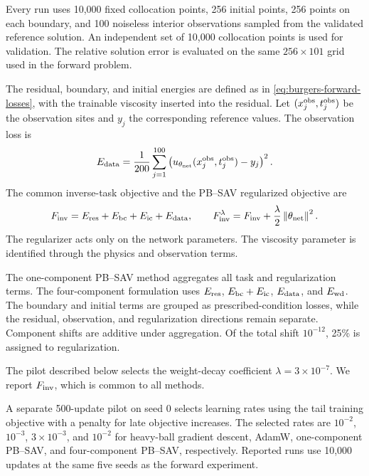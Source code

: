 Every run uses 10,000 fixed collocation points, 256 initial points, 256 points
on each boundary, and 100 noiseless interior observations sampled from the
validated reference solution.  An independent set of 10,000 collocation
points is used for validation.  The relative solution error is evaluated on
the same \(256\times101\) grid used in the forward problem.

The residual, boundary, and initial energies are defined as in
\cref{eq:burgers-forward-losses}, with the trainable viscosity inserted into
the residual.  Let \((x_j^{\rm obs},t_j^{\rm obs})\) be the observation sites
and \(y_j\) the corresponding reference values.  The observation loss is
\begin{equation}
  E_{\rm data}
  =\frac{1}{200}\sum_{j=1}^{100}
  \left(u_{\theta_{\rm net}}(x_j^{\rm obs},t_j^{\rm obs})-y_j\right)^2.
  \label{eq:burgers-data-loss}
\end{equation}
The common inverse-task objective and the PB--SAV regularized objective are
\begin{equation}
  F_{\rm inv}
  =E_{\rm res}+E_{\rm bc}+E_{\rm ic}+E_{\rm data},
  \qquad
  F_{\rm inv}^{\lambda}
  =F_{\rm inv}+\frac{\lambda}{2}\left\lVert\theta_{\rm net}\right\rVert^2.
  \label{eq:burgers-inverse-objective}
\end{equation}
The regularizer acts only on the network parameters.  The viscosity parameter
is identified through the physics and observation terms.

The one-component PB--SAV method aggregates all task and regularization terms.
The four-component formulation uses \(E_{\rm res}\),
\(E_{\rm bc}+E_{\rm ic}\), \(E_{\rm data}\), and \(E_{\rm wd}\).
The boundary and initial terms are grouped as prescribed-condition losses,
while the residual, observation, and regularization directions remain
separate.  Component shifts are additive under aggregation.  Of the total
shift \(10^{-12}\), 25\% is assigned to regularization.

The pilot described below selects the weight-decay coefficient
\(\lambda=3\times10^{-7}\).  We report \(F_{\rm inv}\), which is common to all
methods.

A separate 500-update pilot on seed 0 selects learning rates using the tail
training objective with a penalty for late objective increases.  The selected
rates are \(10^{-2}\), \(10^{-3}\), \(3\times10^{-3}\), and \(10^{-2}\) for
heavy-ball gradient descent, AdamW, one-component PB--SAV, and four-component
PB--SAV, respectively.  Reported runs use 10,000 updates at the same five seeds as the
forward experiment.

